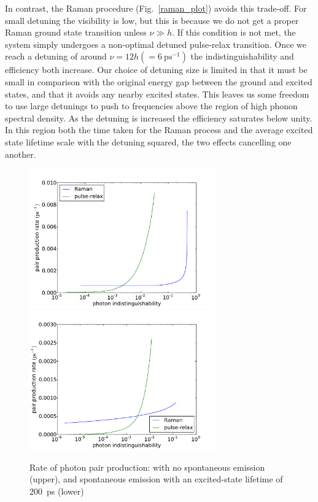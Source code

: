 In contrast, the Raman procedure (Fig.~\ref{raman_plot}) avoids this trade-off. For small detuning the visibility is low, but this is because we do not get a proper Raman ground state transition unless $\nu \gg h$. If this condition is not met, the system simply undergoes a non-optimal detuned pulse-relax transition. Once we reach a detuning of around $\nu = 12h (= 6~\mathrm{ps}^{-1})$ the indistinguishability and efficiency both  increase. Our choice of detuning size is limited in that it must be small in comparison with the original energy gap between the ground and excited states, and that it avoids any nearby excited states. This leaves us some freedom to use large detunings to push to frequencies above the region of high phonon spectral density. As the detuning is increased the efficiency saturates below unity. In this region both the time taken for the Raman process and the average excited state lifetime scale with the detuning squared, the two effects cancelling one another.


\begin{figure}[htb]
  \begin{center}
  \includegraphics[width=8cm]{assets/no_spont_prod_rate.pdf}
  \includegraphics[width=8cm]{assets/rate_of_production_plot.pdf}
  \end{center}
  \caption{Rate of photon pair production: with no spontaneous emission (upper), and spontaneous emission with an excited-state lifetime of $200$~ps (lower)}
  \label{rate_of_production_plot}
\end{figure}

